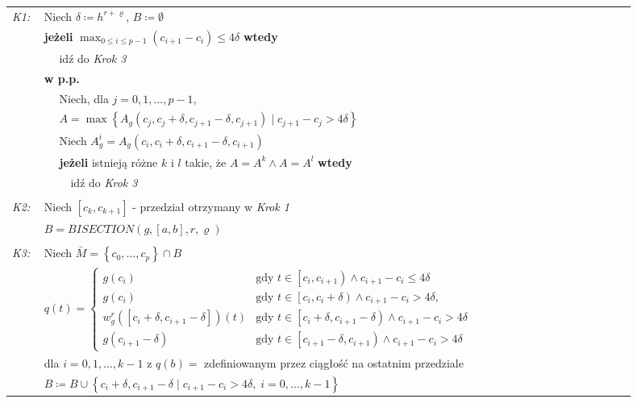 \documentclass[oik, pdftex, robocza, man]{mgrwms}
\begin{document}
\vspace{10pt}
\begin{tabular}{p{0.045\linewidth} p{0.85\linewidth}}
    \textit{K1:}    & Niech $\delta \coloneqq h^{r+\varrho}$, $B \coloneqq \emptyset$ \\
                    & \textbf{jeżeli} \(\displaystyle \max_{0 \leq i \leq p-1} (c_{i+1} - c_{i}) \leq 4\delta \) \textbf{wtedy} \\
                    & $\quad$ idź do \textit{Krok 3} \\
                    & \textbf{w p.p.} \\
                    & $\quad$ Niech, dla $j=0,1, \ldots, p-1$, \\
                    & $\quad$ $A=\max \left\{A_{g}\left(c_{j}, c_{j}+\delta, c_{j+1}-\delta, c_{j+1}\right) \mid c_{j+1}-c_{j}>4 \delta\right\}$ \\
                    & $\quad$ Niech $A_{g}^{i} = A_{g}\left(c_{i}, c_{i}+\delta, c_{i+1}-\delta, c_{i+1}\right)$ \\
                    & $\quad$ \textbf{jeżeli} istnieją różne $k$ i $l$ takie, że $A = A^{k} \land A = A^{l}$ \textbf{wtedy} \\
                    & $\quad\quad$ idź do \textit{Krok 3} \\
                    & \\

    \textit{K2:}    & Niech $[c_{k}, c_{k+1}]$ - przedział otrzymany w \textit{Krok 1}\\
                    & $B = BISECTION(g, [a,b], r, \varrho)$\\
                    & \\

    \textit{K3:}    & Niech $\bar{M} = \left\{ c_{0}, \dots, c_{p} \right\} \cap B$ \\
                    & $q(t)= \begin{cases}
                        g\left(c_{i}\right)                                                 &\text{gdy } t \in \left[c_{i}, c_{i+1}\right) \land c_{i+1}-c_{i} \leq 4 \delta \\ 
                        g\left(c_{i}\right)                                                 &\text{gdy } t \in \left[c_{i}, c_{i}+\delta\right) \land c_{i+1}-c_{i}>4 \delta, \\ 
                        w_{g}^{r}\left(\left[c_{i}+\delta, c_{i+1}-\delta\right]\right)(t)  &\text{gdy } t \in\left[c_{i}+\delta, c_{i+1}-\delta\right) \land c_{i+1}-c_{i}>4 \delta \\ 
                        g\left(c_{i+1}-\delta\right)                                        &\text{gdy } t \in\left[c_{i+1}-\delta, c_{i+1}\right) \land c_{i+1}-c_{i}>4 \delta
                        \end{cases}$ \\
                    & dla $i=0,1,\dots,k-1$ z $q(b) = $ zdefiniowanym przez ciągłość na ostatnim przedziale \\
                    & $B \coloneqq B \cup \left\{ c_{i} + \delta, c_{i+1} - \delta \mid c_{i+1} - c_{i} > 4\delta,\; i=0,\dots,k-1 \right\}$ \\


\end{tabular}
\end{document}
